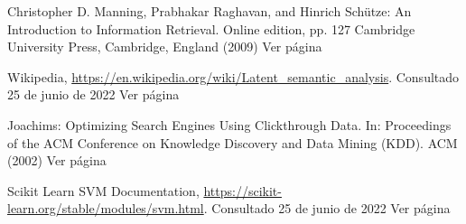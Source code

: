 \documentclass[runningheads]{llncs}
\begin{document}
\newpage
        
\begin{thebibliography}{8}

Christopher D. Manning, Prabhakar Raghavan, and Hinrich Schütze:
An Introduction to Information Retrieval. Online edition, pp. 127 Cambridge University Press,
Cambridge, England (2009) Ver página

Wikipedia, \url{https://en.wikipedia.org/wiki/Latent\_semantic\_analysis}. Consultado 25 de junio de 2022 Ver página

Joachims: Optimizing Search Engines Using Clickthrough Data. In: Proceedings of the ACM Conference 
on Knowledge Discovery and Data Mining (KDD). ACM (2002) Ver página

Scikit Learn SVM Documentation, \url{https://scikit-learn.org/stable/modules/svm.html}. Consultado 25 de junio de 2022 Ver página 

\end{thebibliography}
\end{document}
